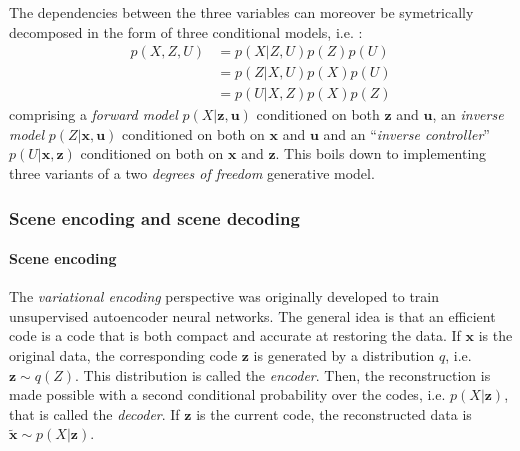 \documentclass[12pt,twoside,openright]{article}
\begin{document}
The dependencies between the three variables can moreover be symetrically decomposed in the form of three conditional models, i.e. :
\begin{align}
	p(X, Z, U) &= p(X| Z, U) p(Z)p(U)\nonumber\\ 
	&= p(Z| X, U)p(X) p(U)\nonumber\\
	&= p(U|X, Z)p(X) p(Z)\nonumber
\end{align}
comprising a \emph{forward model} $p(X|\boldsymbol{z}, \boldsymbol{u})$ 
conditioned on both $\boldsymbol{z}$ and $\boldsymbol{u}$,  an \emph{inverse model} $p(Z|\boldsymbol{x}, \boldsymbol{u})$  conditioned on both on  $\boldsymbol{x}$ and $\boldsymbol{u}$ and an ``\emph{inverse controller}'' $p(U|\boldsymbol{x}, \boldsymbol{z})$ conditioned on both on  $\boldsymbol{x}$ and $\boldsymbol{z}$. This boils down to implementing three variants of a two \emph{degrees of freedom} generative model. 

\subsubsection{Scene encoding and scene decoding}

\paragraph{Scene encoding}
The \emph{variational encoding} perspective \cite{hinton1994autoencoders} was originally developed 
to train unsupervised autoencoder neural networks. The general idea is that an efficient code 
is a code that is both compact and accurate at restoring the data. 
If $\boldsymbol{x}$ is the original data, the corresponding code $\boldsymbol{z}$ is generated by a distribution $q$, i.e. $\boldsymbol{z} \sim q(Z)$. This distribution is called the \emph{encoder}. Then, the reconstruction is made possible with a second conditional probability over the codes, i.e. $p(X|\boldsymbol{z})$, that is called the \emph{decoder}. If $\boldsymbol{z}$ is the current code, the reconstructed data is $\tilde{\boldsymbol{x}} \sim p(X|\boldsymbol{z})$. 
 
\end{document}
